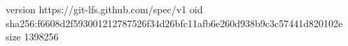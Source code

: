 version https://git-lfs.github.com/spec/v1
oid sha256:f6608d2f593001212787526f34d26bfc11afb6e260d938b9c3c57441d820102e
size 1398256
